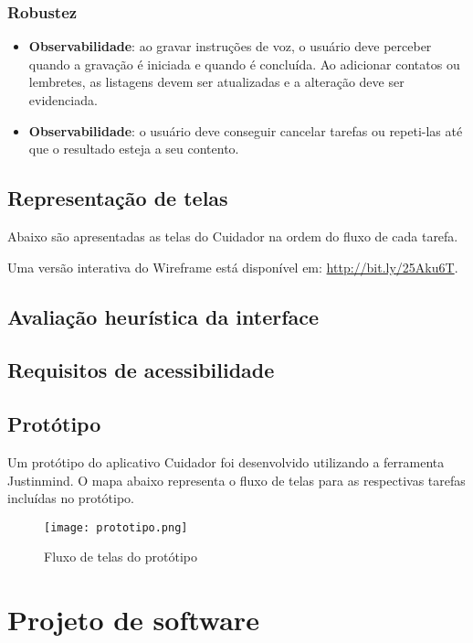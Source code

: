 \subsubsection*{Robustez}

\begin{itemize}
    \item \textbf{Observabilidade}: ao gravar instruções de voz, o usuário deve perceber quando a gravação é iniciada e quando é concluída. Ao adicionar contatos ou lembretes, as listagens devem ser atualizadas e a alteração deve ser evidenciada.
    \item \textbf{Observabilidade}: o usuário deve conseguir cancelar tarefas ou repeti-las até que o resultado esteja a seu contento.    
\end{itemize}


\subsection{Representação de telas}

Abaixo são apresentadas as telas do Cuidador na ordem do fluxo de cada tarefa.

Uma versão interativa do Wireframe está disponível em: \url{http://bit.ly/25Aku6T}.


\subsection{Avaliação heurística da interface}

\subsection{Requisitos de acessibilidade}

\subsection{Protótipo}

Um protótipo do aplicativo Cuidador foi desenvolvido utilizando a ferramenta Justinmind. O mapa abaixo representa o fluxo de telas para as respectivas tarefas incluídas no protótipo.

\begin{figure}[h]
\centering
\texttt{[image: prototipo.png]}
\caption{Fluxo de telas do protótipo}
\end{figure}

\section{Projeto de software}

